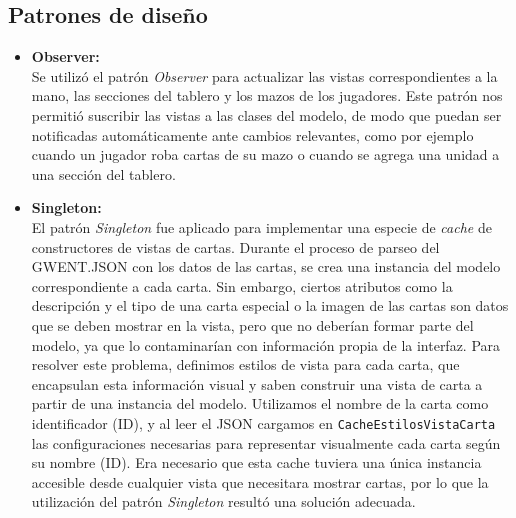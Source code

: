 \documentclass[titlepage,a4paper]{article}
\begin{document}



	\subsection{Patrones de diseño}\label{sup:patrones}

	\begin{itemize}
		\item \textbf{Observer:} \\
		Se utilizó el patrón \textit{Observer} para actualizar las vistas correspondientes a la mano, las secciones del tablero y los mazos de los jugadores. Este patrón nos permitió suscribir las vistas a las clases del modelo, de modo que puedan ser notificadas automáticamente ante cambios relevantes, como por ejemplo cuando un jugador roba cartas de su mazo o cuando se agrega una unidad a una sección del tablero.

		\item \textbf{Singleton:} \\
		El patrón \textit{Singleton} fue aplicado para implementar una especie de \textit{cache} de constructores de vistas de cartas. Durante el proceso de parseo del GWENT.JSON con los datos de las cartas, se crea una instancia del modelo correspondiente a cada carta. Sin embargo, ciertos atributos como la descripción y el tipo de una carta especial o la imagen de las cartas son datos que se deben mostrar en la vista, pero que no deberían formar parte del modelo, ya que lo contaminarían con información propia de la interfaz.
		Para resolver este problema, definimos estilos de vista para cada carta, que encapsulan esta información visual y saben construir una vista de carta a partir de una instancia del modelo. Utilizamos el nombre de la carta como identificador (ID), y al leer el JSON cargamos en \texttt{CacheEstilosVistaCarta} las configuraciones necesarias para representar visualmente cada carta según su nombre (ID).
		Era necesario que esta cache tuviera una única instancia accesible desde cualquier vista que necesitara mostrar cartas, por lo que la utilización del patrón \textit{Singleton} resultó una solución adecuada.


\end{itemize}
\end{document}
